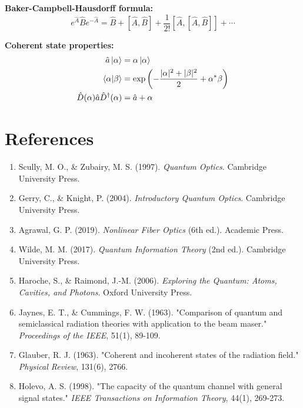 \documentclass[12pt,a4paper]{article}
\begin{document}
\textbf{Baker-Campbell-Hausdorff formula:}
\begin{equation}
e^{\hat{A}}\hat{B}e^{-\hat{A}} = \hat{B} + [\hat{A}, \hat{B}] + \frac{1}{2!}[\hat{A}, [\hat{A}, \hat{B}]] + \cdots
\end{equation}

\textbf{Coherent state properties:}
\begin{align}
\hat{a}\ket{\alpha} &= \alpha\ket{\alpha}\\
\braket{\alpha}{\beta} &= \exp\left(-\frac{|\alpha|^2 + |\beta|^2}{2} + \alpha^*\beta\right)\\
\hat{D}(\alpha)\hat{a}\hat{D}^\dagger(\alpha) &= \hat{a} + \alpha
\end{align}

\section*{References}

\begin{enumerate}[leftmargin=*]
\item Scully, M. O., \& Zubairy, M. S. (1997). \textit{Quantum Optics}. Cambridge University Press.
\item Gerry, C., \& Knight, P. (2004). \textit{Introductory Quantum Optics}. Cambridge University Press.
\item Agrawal, G. P. (2019). \textit{Nonlinear Fiber Optics} (6th ed.). Academic Press.
\item Wilde, M. M. (2017). \textit{Quantum Information Theory} (2nd ed.). Cambridge University Press.
\item Haroche, S., \& Raimond, J.-M. (2006). \textit{Exploring the Quantum: Atoms, Cavities, and Photons}. Oxford University Press.
\item Jaynes, E. T., \& Cummings, F. W. (1963). "Comparison of quantum and semiclassical radiation theories with application to the beam maser." \textit{Proceedings of the IEEE}, 51(1), 89-109.
\item Glauber, R. J. (1963). "Coherent and incoherent states of the radiation field." \textit{Physical Review}, 131(6), 2766.
\item Holevo, A. S. (1998). "The capacity of the quantum channel with general signal states." \textit{IEEE Transactions on Information Theory}, 44(1), 269-273.
\end{enumerate}
\end{document}
